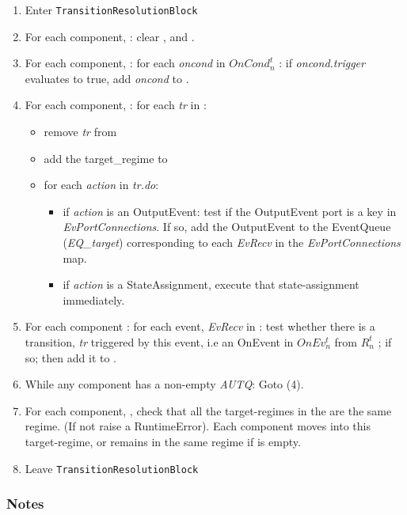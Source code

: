 \documentclass[draftspec]{ninemlspec}
\begin{document}
\begin{enumerate}
\item Enter {\tt TransitionResolutionBlock}
\item For each component, \CN: clear \RCLn, \AUTQn and \EQn.
\item For each component, \CN: for each \textsl{oncond} in $OnCond^{t}_{n}$ : if
\textsl{oncond.trigger} evaluates to true, add \textsl{oncond} to \AUTQn.
\item For each component, \CN:  for each \textsl{tr} in \AUTQn :
\begin{itemize}
\item
remove \textsl{tr} from \AUTQn
\item add the target\_regime to \RCLn
\item for each
\textsl{action} in \textsl{tr.do}:
\begin{itemize}
\item if \textsl{action} is an OutputEvent: test
if the OutputEvent port is a key in \textsl{EvPortConnections}. If so, add the
    OutputEvent to the EventQueue (\textsl{EQ\_{target}}) corresponding to each
    \textsl{EvRecv} in the \textsl{EvPortConnections} map.

\item  if \textsl{action}  is a StateAssignment, execute that state-assignment
immediately.
\end{itemize}
\end{itemize}

\item For each component \CN: for each event, \textsl{EvRecv} in \EQn: test
whether there is a transition, \textsl{tr} triggered by this event, i.e an
OnEvent in $OnEv^t_n$ from $R^t_n$ ; if so; then add it to \AUTQn.

\item While any component has a non-empty \textsl{AUTQ}: Goto (4).

\item For each component, \CN, check that all the target-regimes in the \RCLn
are the same regime. (If not raise a RuntimeError). Each component moves into
this target-regime, or remains in the same regime if \RCLn is empty.

\item Leave {\tt TransitionResolutionBlock}

\end{enumerate}

\subsubsection{Notes}
\end{document}
